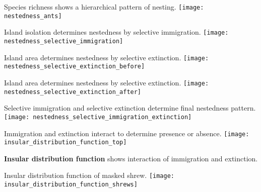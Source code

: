 \documentclass[xcolor=svgnames]{beamer}
\begin{document}
\begin{frame}{Species richness shows a hierarchical pattern of nesting.}
	\centering
		\texttt{[image: nestedness\_ants]} \\
\end{frame}

\begin{frame}{Island isolation determines nestedness by selective immigration.}
	\centering
		\texttt{[image: nestedness\_selective\_immigration]} \\
\end{frame}

\begin{frame}{Island area determines nestedness by selective extinction.}
	\centering
		\texttt{[image: nestedness\_selective\_extinction\_before]} \\
\end{frame}

\begin{frame}{Island area determines nestedness by selective extinction.}
	\centering
		\texttt{[image: nestedness\_selective\_extinction\_after]} \\
\end{frame}

\begin{frame}{Selective immigration and selective extinction determine final nestedness pattern.}
	\centering
		\texttt{[image: nestedness\_selective\_immigration\_extinction]} \\
\end{frame}

\begin{frame}{Immigration and extinction interact to determine presence or absence.}
	\centering
		\texttt{[image: insular\_distribution\_function\_top]}\\
		\pause
		\begin{block}{}
			\textbf{Insular distribution function} shows interaction of immigration and extinction.
		\end{block}
\end{frame}

\begin{frame}{Insular distribution function of masked shrew.}
	\centering
		\texttt{[image: insular\_distribution\_function\_shrews]}\\
	\pause
\end{frame}
\end{document}

